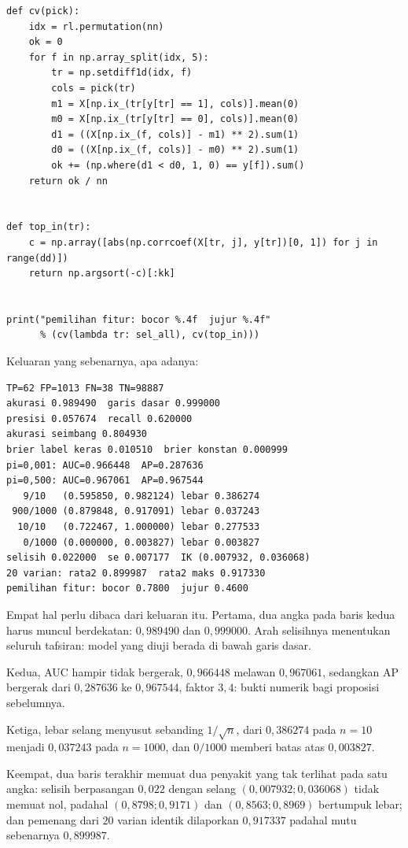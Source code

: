 \begin{lab}
\begin{verbatim}
def cv(pick):
    idx = rl.permutation(nn)
    ok = 0
    for f in np.array_split(idx, 5):
        tr = np.setdiff1d(idx, f)
        cols = pick(tr)
        m1 = X[np.ix_(tr[y[tr] == 1], cols)].mean(0)
        m0 = X[np.ix_(tr[y[tr] == 0], cols)].mean(0)
        d1 = ((X[np.ix_(f, cols)] - m1) ** 2).sum(1)
        d0 = ((X[np.ix_(f, cols)] - m0) ** 2).sum(1)
        ok += (np.where(d1 < d0, 1, 0) == y[f]).sum()
    return ok / nn


def top_in(tr):
    c = np.array([abs(np.corrcoef(X[tr, j], y[tr])[0, 1]) for j in range(dd)])
    return np.argsort(-c)[:kk]


print("pemilihan fitur: bocor %.4f  jujur %.4f"
      % (cv(lambda tr: sel_all), cv(top_in)))
\end{verbatim}
\end{lab}

Keluaran yang sebenarnya, apa adanya:

\begin{verbatim}
TP=62 FP=1013 FN=38 TN=98887
akurasi 0.989490  garis dasar 0.999000
presisi 0.057674  recall 0.620000
akurasi seimbang 0.804930
brier label keras 0.010510  brier konstan 0.000999
pi=0,001: AUC=0.966448  AP=0.287636
pi=0,500: AUC=0.967061  AP=0.967544
   9/10   (0.595850, 0.982124) lebar 0.386274
 900/1000 (0.879848, 0.917091) lebar 0.037243
  10/10   (0.722467, 1.000000) lebar 0.277533
   0/1000 (0.000000, 0.003827) lebar 0.003827
selisih 0.022000  se 0.007177  IK (0.007932, 0.036068)
20 varian: rata2 0.899987  rata2 maks 0.917330
pemilihan fitur: bocor 0.7800  jujur 0.4600
\end{verbatim}

Empat hal perlu dibaca dari keluaran itu. Pertama, dua angka pada baris kedua harus muncul
berdekatan: $0{,}989490$ dan $0{,}999000$. Arah selisihnya menentukan seluruh tafsiran:
model yang diuji berada di bawah garis dasar.

Kedua, AUC hampir tidak bergerak, $0{,}966448$ melawan $0{,}967061$, sedangkan AP bergerak
dari $0{,}287636$ ke $0{,}967544$, faktor $3{,}4$: bukti numerik bagi proposisi sebelumnya.

Ketiga, lebar selang menyusut sebanding $1/\sqrt n$, dari $0{,}386274$ pada $n=10$ menjadi
$0{,}037243$ pada $n=1000$, dan $0/1000$ memberi batas atas $0{,}003827$.

Keempat, dua baris terakhir memuat dua penyakit yang tak terlihat pada satu angka: selisih
berpasangan $0{,}022$ dengan selang $(0{,}007932;0{,}036068)$ tidak memuat nol, padahal
$(0{,}8798;0{,}9171)$ dan $(0{,}8563;0{,}8969)$ bertumpuk lebar; dan pemenang dari $20$
varian identik dilaporkan $0{,}917337$ padahal mutu sebenarnya $0{,}899987$.

